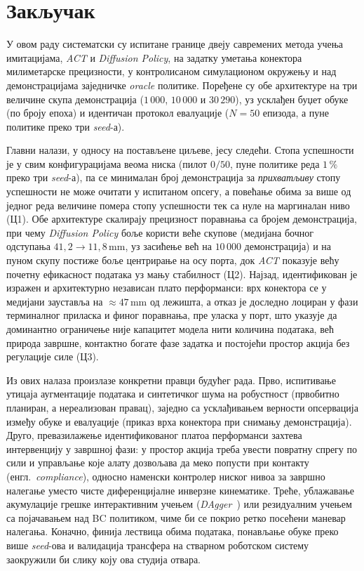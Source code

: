 \documentclass[12pt, a4paper]{article}
\begin{document}
\section{Закључак}
\label{sec:zakljucak}

У овом раду систематски су испитане границе двеју савремених метода учења имитацијама, \textit{ACT} и \textit{Diffusion Policy}, на задатку уметања конектора милиметарске прецизности, у контролисаном симулационом окружењу и над демонстрацијама заједничке \textit{oracle} политике.
Поређене су обе архитектуре на три величине скупа демонстрација ($1\,000$, $10\,000$ и $30\,290$), уз усклађен буџет обуке (по броју епоха) и идентичан протокол евалуације ($N=50$ епизода, а пуне политике преко три \textit{seed}-а).

Главни налази, у односу на постављене циљеве, јесу следећи.
Стопа успешности је у свим конфигурацијама веома ниска (пилот $0/50$, пуне политике реда $1\,\%$ преко три \textit{seed}-а), па се минималан број демонстрација за \emph{прихватљиву} стопу успешности не може очитати у испитаном опсегу, а повећање обима за више од једног реда величине помера стопу успешности тек са нуле на маргиналан ниво (Ц1).
Обе архитектуре скалирају прецизност поравнања са бројем демонстрација, при чему \textit{Diffusion Policy} боље користи веће скупове (медијана бочног одступања $41{,}2 \to 11{,}8$\,mm, уз засићење већ на $10\,000$ демонстрација) и на пуном скупу постиже боље центрирање на осу порта, док \textit{ACT} показује већу почетну ефикасност података уз мању стабилност (Ц2).
Најзад, идентификован је изражен и архитектурно независан плато перформанси: врх конектора се у медијани зауставља на $\approx 47$\,mm од лежишта, а отказ је доследно лоциран у фази терминалног приласка и финог поравнања, пре уласка у порт, што указује да доминантно ограничење није капацитет модела нити количина података, већ природа завршне, контактно богате фазе задатка и постојећи простор акција без регулације силе (Ц3).

Из ових налаза произлазе конкретни правци будућег рада.
Прво, испитивање утицаја аугментације података и синтетичког шума на робустност (првобитно планиран, а нереализован правац), заједно са усклађивањем верности опсервација између обуке и евалуације (приказ врха конектора при снимању демонстрација).
Друго, превазилажење идентификованог платоа перформанси захтева интервенцију у завршној фази: у простор акција треба увести повратну спрегу по сили и управљање које алату дозвољава да меко попусти при контакту (енгл.\ \textit{compliance}), односно наменски контролер ниског нивоа за завршно налегање уместо чисте диференцијалне инверзне кинематике.
Треће, ублажавање акумулације грешке интерактивним учењем (\textit{DAgger}~\cite{ross2011dagger}) или резидуалним учењем са појачавањем над BC политиком, чиме би се покрио ретко посећени маневар налегања.
Коначно, финија лествица обима података, понављање обуке преко више \textit{seed}-ова и валидација трансфера на стварном роботском систему заокружили би слику коју ова студија отвара.

\listoffigures

\listoftables

\printbibliography[heading=bibintoc, title={Литература}]
\end{document}
